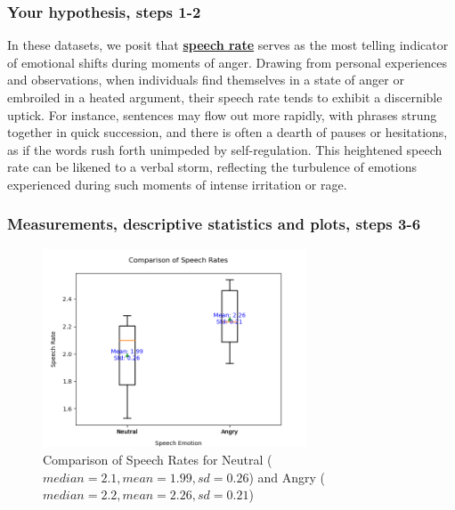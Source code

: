 \documentclass{../labbook}
\begin{document}
\begin{solution}

\subsubsection{Your hypothesis, steps 1-2}

In these datasets, we posit that \underline{\textbf{speech rate}} serves as the most telling indicator of emotional shifts during moments of anger. Drawing from personal experiences and observations, when individuals find themselves in a state of anger or embroiled in a heated argument, their speech rate tends to exhibit a discernible uptick. For instance, sentences may flow out more rapidly, with phrases strung together in quick succession, and there is often a dearth of pauses or hesitations, as if the words rush forth unimpeded by self-regulation. This heightened speech rate can be likened to a verbal storm, reflecting the turbulence of emotions experienced during such moments of intense irritation or rage.

\subsubsection{Measurements, descriptive statistics and plots, steps 3-6}

\begin{figure}[h!]
    \centering
    \includegraphics[width=0.7\textwidth]{1stM.png}
    \caption{Comparison of Speech Rates for Neutral ($median=2.1, mean=1.99, sd=0.26$) and Angry ($median=2.2,mean=2.26, sd=0.21$)}
\end{figure}


\end{solution}
\end{document}
